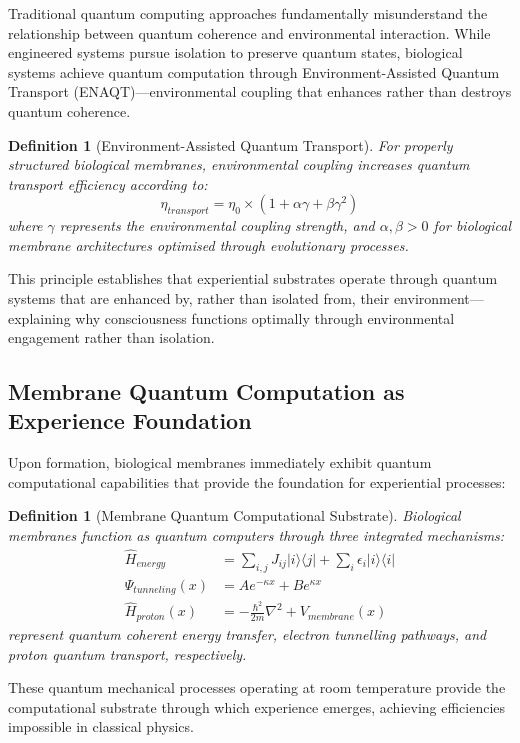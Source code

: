 \documentclass{article}
\newtheorem{definition}[theorem]{Definition}
\begin{document}
Traditional quantum computing approaches fundamentally misunderstand the relationship between quantum coherence and environmental interaction. While engineered systems pursue isolation to preserve quantum states, biological systems achieve quantum computation through Environment-Assisted Quantum Transport (ENAQT)—environmental coupling that enhances rather than destroys quantum coherence.

\begin{definition}[Environment-Assisted Quantum Transport]
For properly structured biological membranes, environmental coupling increases quantum transport efficiency according to:
$$\eta_{transport} = \eta_0 \times (1 + \alpha \gamma + \beta \gamma^2)$$
where $\gamma$ represents the environmental coupling strength, and $\alpha, \beta > 0$ for biological membrane architectures optimised through evolutionary processes.
\end{definition}

This principle establishes that experiential substrates operate through quantum systems that are enhanced by, rather than isolated from, their environment—explaining why consciousness functions optimally through environmental engagement rather than isolation.

\subsection{Membrane Quantum Computation as Experience Foundation}

Upon formation, biological membranes immediately exhibit quantum computational capabilities that provide the foundation for experiential processes:

\begin{definition}[Membrane Quantum Computational Substrate]
Biological membranes function as quantum computers through three integrated mechanisms:
\begin{align}
\hat{H}_{energy} &= \sum_{i,j} J_{ij} |i\rangle\langle j| + \sum_i \epsilon_i |i\rangle\langle i| \\
\Psi_{tunneling}(x) &= A e^{-\kappa x} + B e^{\kappa x} \\
\hat{H}_{proton}(x) &= -\frac{\hbar^2}{2m}\nabla^2 + V_{membrane}(x)
\end{align}
represent quantum coherent energy transfer, electron tunnelling pathways, and proton quantum transport, respectively.
\end{definition}

These quantum mechanical processes operating at room temperature provide the computational substrate through which experience emerges, achieving efficiencies impossible in classical physics.
\end{document}
